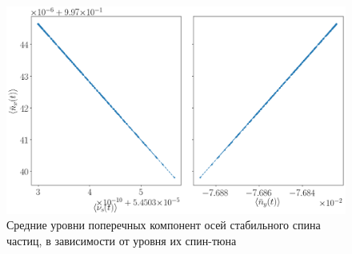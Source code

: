 \begin{figure}[H]\centering
	\includegraphics[height=.3\paperheight]{images/decoh_sim/mean_n_bar_vs_spin_tune}
	\caption{Средние уровни поперечных компонент осей стабильного спина частиц, в зависимости от уровня их спин-тюна\label{decoh:fig:nbar_vs_ST}}
\end{figure}

